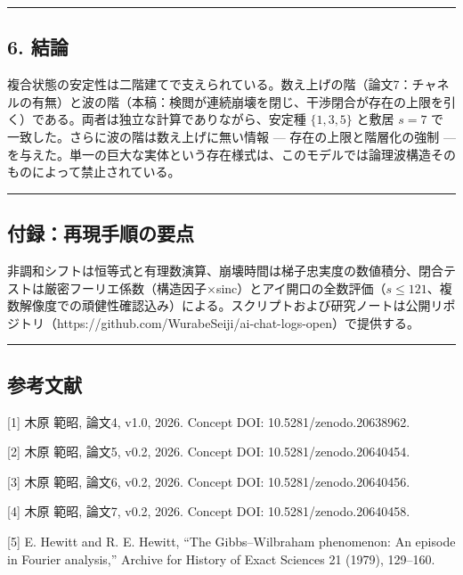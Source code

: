\documentclass[
]{ltjsarticle}
\begin{document}
\begin{center}\rule{0.5\linewidth}{0.5pt}\end{center}

\subsection{6. 結論}\label{ux7d50ux8ad6}

複合状態の安定性は二階建てで支えられている。数え上げの階（論文7：チャネルの有無）と波の階（本稿：検閲が連続崩壊を閉じ、干渉閉合が存在の上限を引く）である。両者は独立な計算でありながら、安定種
\(\{1,3,5\}\) と敷居 \(s=7\)
で一致した。さらに波の階は数え上げに無い情報 ---
存在の上限と階層化の強制 ---
を与えた。単一の巨大な実体という存在様式は、このモデルでは論理波構造そのものによって禁止されている。

\begin{center}\rule{0.5\linewidth}{0.5pt}\end{center}

\subsection{付録：再現手順の要点}\label{ux4ed8ux9332ux518dux73feux624bux9806ux306eux8981ux70b9}

非調和シフトは恒等式と有理数演算、崩壊時間は梯子忠実度の数値積分、閉合テストは厳密フーリエ係数（構造因子×sinc）とアイ開口の全数評価（\(s\le121\)、複数解像度での頑健性確認込み）による。スクリプトおよび研究ノートは公開リポジトリ（https://github.com/WurabeSeiji/ai-chat-logs-open）で提供する。

\begin{center}\rule{0.5\linewidth}{0.5pt}\end{center}

\subsection{参考文献}\label{ux53c2ux8003ux6587ux732e}

{[}1{]} 木原 範昭, 論文4, v1.0, 2026. Concept DOI:
10.5281/zenodo.20638962.

{[}2{]} 木原 範昭, 論文5, v0.2, 2026. Concept DOI: 10.5281/zenodo.20640454.

{[}3{]} 木原 範昭, 論文6, v0.2, 2026. Concept DOI: 10.5281/zenodo.20640456.

{[}4{]} 木原 範昭, 論文7, v0.2, 2026. Concept DOI: 10.5281/zenodo.20640458.

{[}5{]} E. Hewitt and R. E. Hewitt, ``The Gibbs--Wilbraham phenomenon:
An episode in Fourier analysis,'' Archive for History of Exact Sciences
21 (1979), 129--160.
\end{document}
